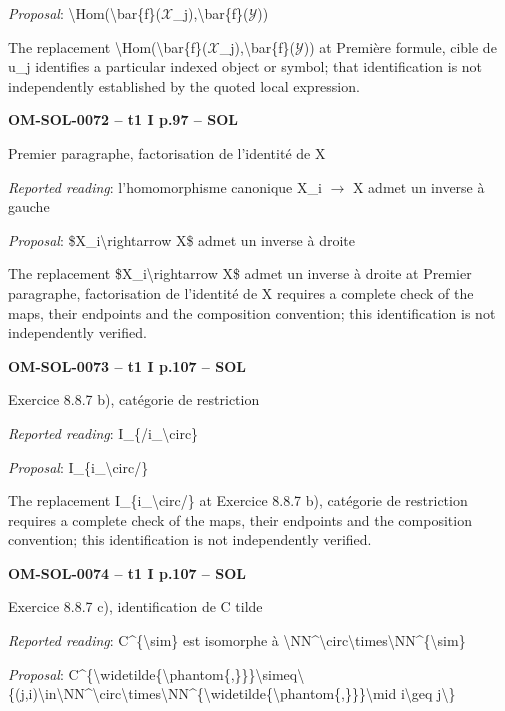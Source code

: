 \emph{Proposal}: \textbackslash{}Hom(\textbackslash{}bar\{f\}(\ensuremath{𝒳}\_j),\textbackslash{}bar\{f\}(\ensuremath{𝒴}))\par
The replacement \textbackslash{}Hom(\textbackslash{}bar\{f\}(\ensuremath{𝒳}\_j),\textbackslash{}bar\{f\}(\ensuremath{𝒴})) at Première formule, cible de u\_j identifies a particular indexed object or symbol; that identification is not independently established by the quoted local expression.\par
\par\noindent\textbf{OM-SOL-0072 -- t1 I p.97 -- SOL}\par
Premier paragraphe, factorisation de l'identité de X\par
\emph{Reported reading}: l'homomorphisme canonique X\_i \ensuremath{\to} X admet un inverse à gauche\par
\emph{Proposal}: \$X\_i\textbackslash{}rightarrow X\$ admet un inverse à droite\par
The replacement \$X\_i\textbackslash{}rightarrow X\$ admet un inverse à droite at Premier paragraphe, factorisation de l'identité de X requires a complete check of the maps, their endpoints and the composition convention; this identification is not independently verified.\par
\par\noindent\textbf{OM-SOL-0073 -- t1 I p.107 -- SOL}\par
Exercice 8.8.7 b), catégorie de restriction\par
\emph{Reported reading}: I\_\{/i\_\textbackslash{}circ\}\par
\emph{Proposal}: I\_\{i\_\textbackslash{}circ/\}\par
The replacement I\_\{i\_\textbackslash{}circ/\} at Exercice 8.8.7 b), catégorie de restriction requires a complete check of the maps, their endpoints and the composition convention; this identification is not independently verified.\par
\par\noindent\textbf{OM-SOL-0074 -- t1 I p.107 -- SOL}\par
Exercice 8.8.7 c), identification de C tilde\par
\emph{Reported reading}: C\textasciicircum{}\{\textbackslash{}sim\} est isomorphe à \textbackslash{}NN\textasciicircum{}\textbackslash{}circ\textbackslash{}times\textbackslash{}NN\textasciicircum{}\{\textbackslash{}sim\}\par
\emph{Proposal}: C\textasciicircum{}\{\textbackslash{}widetilde\{\textbackslash{}phantom\{,\}\}\}\textbackslash{}simeq\textbackslash{}\{(j,i)\textbackslash{}in\textbackslash{}NN\textasciicircum{}\textbackslash{}circ\textbackslash{}times\textbackslash{}NN\textasciicircum{}\{\textbackslash{}widetilde\{\textbackslash{}phantom\{,\}\}\}\textbackslash{}mid i\textbackslash{}geq j\textbackslash{}\}\par
